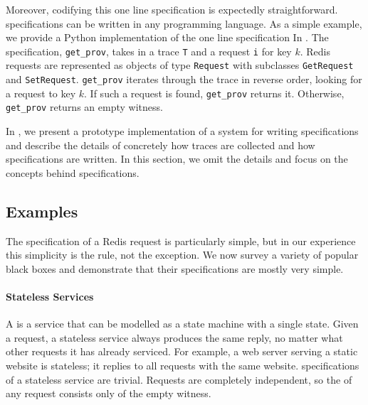 Moreover, codifying this one line \watprovenance{} specification is expectedly
straightforward. \Watprovenance{} specifications can be written in any
programming language. As a simple example, we provide a Python implementation
of the one line \watprovenance{} specification In .  The
specification, \texttt{get\_prov}, takes in a trace \texttt{T} and a \kvget{}
request \texttt{i} for key $k$. Redis requests are represented as objects of
type \texttt{Request} with subclasses \texttt{GetRequest} and
\texttt{SetRequest}.  \texttt{get\_prov} iterates through the trace in reverse
order, looking for a \kvset{} request to key $k$. If such a \kvset{} request is
found, \texttt{get\_prov} returns it. Otherwise, \texttt{get\_prov} returns an
empty witness.

{}

In , we present a prototype implementation of a system for
writing \watprovenance{} specifications and describe the details of concretely
how traces are collected and how \watprovenance{} specifications are written.
In this section, we omit the details and focus on the concepts behind
\watprovenance{} specifications.

\subsection{Examples}
The \watprovenance{} specification of a Redis \kvget{} request is particularly
simple, but in our experience this simplicity is the rule, not the exception.
We now survey a variety of popular black boxes and demonstrate that their
\watprovenance{} specifications are mostly very simple.

\paragraph{Stateless Services}
A  is a service that can be modelled as a state
machine with a single state. Given a request, a stateless service always
produces the same reply, no matter what other requests it has already serviced.
For example, a web server serving a static website is stateless; it replies to
all requests with the same website. \Watprovenance{} specifications of a
stateless service are trivial. Requests are completely independent, so the
\watprovenance{} of any request consists only of the empty witness.

